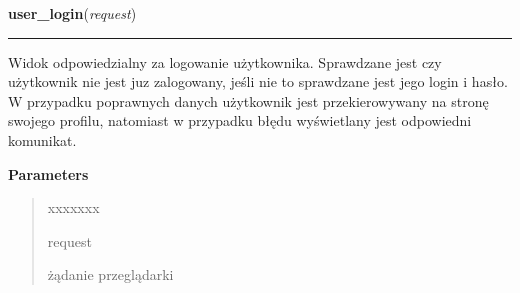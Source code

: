 \hspace{.8\funcindent}\begin{boxedminipage}{\funcwidth}

    \raggedright \textbf{user\_login}(\textit{request})

    \vspace{-1.5ex}

    \rule{\textwidth}{0.5\fboxrule}
\setlength{\parskip}{2ex}
    Widok odpowiedzialny za logowanie użytkownika. Sprawdzane jest czy 
    użytkownik nie jest juz zalogowany, jeśli nie to sprawdzane jest jego 
    login i hasło. W przypadku poprawnych danych użytkownik jest 
    przekierowywany na stronę swojego profilu, natomiast w przypadku błędu 
    wyświetlany jest odpowiedni komunikat.

\setlength{\parskip}{1ex}
      \textbf{Parameters}
      \vspace{-1ex}

      \begin{quote}
        \begin{Ventry}{xxxxxxx}

          \item[request]

          żądanie przeglądarki

        \end{Ventry}

      \end{quote}

    \end{boxedminipage}

    \label{ass8_portal:accounts:views:user_logout}

    \vspace{0.5ex}

